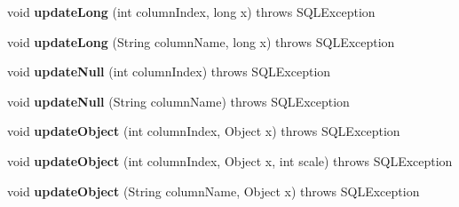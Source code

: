 \begin{DoxyCompactItemize}
\item 
\mbox{\label{classcom_1_1mysql_1_1cj_1_1jdbc_1_1result_1_1_updatable_result_set_ab16712b76cb0a3d4135c26212979e33a}} 
void {\bfseries update\+Long} (int column\+Index, long x)  throws S\+Q\+L\+Exception 
\item 
\mbox{\label{classcom_1_1mysql_1_1cj_1_1jdbc_1_1result_1_1_updatable_result_set_aff65ae57f836c6e578bd26b4d1fe3155}} 
void {\bfseries update\+Long} (String column\+Name, long x)  throws S\+Q\+L\+Exception 
\item 
\mbox{\label{classcom_1_1mysql_1_1cj_1_1jdbc_1_1result_1_1_updatable_result_set_a42488030279d1a6c273045bec19ed373}} 
void {\bfseries update\+Null} (int column\+Index)  throws S\+Q\+L\+Exception 
\item 
\mbox{\label{classcom_1_1mysql_1_1cj_1_1jdbc_1_1result_1_1_updatable_result_set_ae98e7a025f6d44f069cdd7a06805697a}} 
void {\bfseries update\+Null} (String column\+Name)  throws S\+Q\+L\+Exception 
\item 
\mbox{\label{classcom_1_1mysql_1_1cj_1_1jdbc_1_1result_1_1_updatable_result_set_a01063e5c025c2d171406e0ec8605f755}} 
void {\bfseries update\+Object} (int column\+Index, Object x)  throws S\+Q\+L\+Exception 
\item 
\mbox{\label{classcom_1_1mysql_1_1cj_1_1jdbc_1_1result_1_1_updatable_result_set_ab235e712d0c03c2a12ed4bdc2c90a54e}} 
void {\bfseries update\+Object} (int column\+Index, Object x, int scale)  throws S\+Q\+L\+Exception 
\item 
\mbox{\label{classcom_1_1mysql_1_1cj_1_1jdbc_1_1result_1_1_updatable_result_set_a8dbd2409937a009e47b7d98524fd2d69}} 
void {\bfseries update\+Object} (String column\+Name, Object x)  throws S\+Q\+L\+Exception 
\item 

\end{DoxyCompactItemize}
